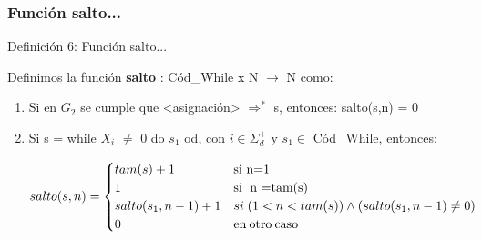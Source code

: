 \documentclass[xcolor=table]{beamer}
\begin{document}
\begin{frame}[fragile]\frametitle{Función salto...} \footnotesize
\begin{block}{Definición 6: Función salto...} 
\end{block}

Definimos la función \textbf{salto} : Cód\_While x N $\rightarrow$ N como:

\begin{enumerate}
     \item Si en $G_2$ se cumple que <asignación> $\Rightarrow^*$ s, entonces: salto(s,n) = 0

      \item Si s = while $X_i$ $\neq$ 0 do $s_1$ od, con $i \in \Sigma_d^+$ y $s_1 \in$ Cód\_While, entonces:

         \scriptsize\begin{equation*} salto(s,n) = 
            \begin{cases} 
                    tam(s)+1              & \text{si n=1}\\
                    1                     & \text{si\; n =tam(s)}\\
                    salto(s_1,n-1)+1      & si\; (1<n<tam(s)) \wedge (salto(s_1,n-1) \neq 0) \\
                    0                     & \text{en\:otro\:caso}
            \end{cases} \end{equation*}   
        
\end{enumerate}

\end{frame}
\end{document}
